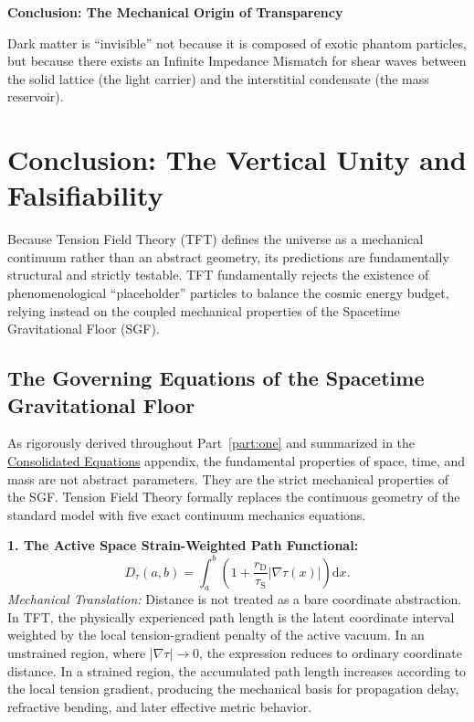 \vspace{0.3em}
\noindent \textbf{Conclusion: The Mechanical Origin of Transparency}

\noindent Dark matter is ``invisible'' not because it is composed of exotic phantom particles, but because there exists an Infinite Impedance Mismatch for shear waves between the solid lattice (the light carrier) and the interstitial condensate (the mass reservoir).

\chapter{Conclusion: The Vertical Unity and Falsifiability}

Because Tension Field Theory (TFT) defines the universe as a mechanical continuum rather than an abstract geometry, its predictions are fundamentally structural and strictly testable. TFT fundamentally rejects the existence of phenomenological ``placeholder'' particles to balance the cosmic energy budget, relying instead on the coupled mechanical properties of the Spacetime Gravitational Floor (SGF).

\section{The Governing Equations of the Spacetime Gravitational Floor}

As rigorously derived throughout Part~\ref{part:one} and summarized in the \hyperref[app:consolidated_equations]{Consolidated Equations} appendix, the fundamental properties of space, time, and mass are not abstract parameters. They are the strict mechanical properties of the SGF. Tension Field Theory formally replaces the continuous geometry of the standard model with five exact continuum mechanics equations.

\vspace{0.5em}
\noindent \textbf{1. The Active Space Strain-Weighted Path Functional:}
\begin{equation}
    D_\tau(a,b) = \int_a^b \left( 1 + \frac{r_{\mathrm{D}}}{\tau_{\mathrm{S}}} |\nabla\tau(x)| \right) \mathrm{d}x .
\end{equation}
\textit{Mechanical Translation:}
Distance is not treated as a bare coordinate abstraction. In TFT, the physically experienced path length is the latent coordinate interval weighted by the local tension-gradient penalty of the active vacuum. In an unstrained region, where $|\nabla\tau| \rightarrow 0$, the expression reduces to ordinary coordinate distance. In a strained region, the accumulated path length increases according to the local tension gradient, producing the mechanical basis for propagation delay, refractive bending, and later effective metric behavior.

